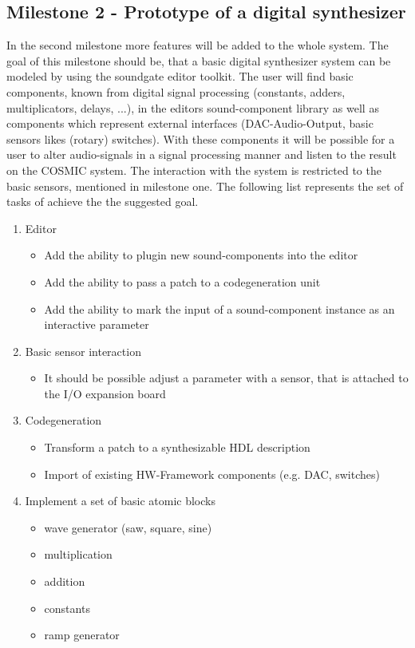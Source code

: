 \subsection{Milestone 2 - Prototype of a digital synthesizer}

In the second milestone more features will be added to the whole system. The goal of this milestone should be, that a basic digital synthesizer system can be modeled by using the soundgate editor toolkit. The user will find basic components, known from digital signal processing (constants, adders, multiplicators, delays, ...), in the editors sound-component library as well as components which represent external interfaces (DAC-Audio-Output, basic sensors likes (rotary) switches). With these components it will be possible for a user to alter audio-signals in a signal processing manner and listen to the result on the \ac{COSMIC} system. The interaction with the system is restricted to the basic sensors, mentioned in milestone one. The following list represents the set of tasks of achieve the the suggested goal.

	\begin{enumerate}
		\item Editor
			\begin{itemize}
				\item Add the ability to plugin new sound-components into the editor
				\item Add the ability to pass a patch to a codegeneration unit
				\item Add the ability to mark the input of a sound-component instance as an interactive parameter
			\end{itemize}
		\item Basic sensor interaction
			\begin{itemize}
				\item It should be possible adjust a parameter with a sensor, that is attached to the I/O expansion board
			\end{itemize}
		\item Codegeneration	
			\begin{itemize}
				\item Transform a patch to a synthesizable HDL description
				\item Import of existing HW-Framework components (e.g. DAC, switches)
			\end{itemize}
		\item Implement a set of basic atomic blocks
			\begin{itemize}
				\item wave generator (saw, square, sine)
				\item multiplication
				\item addition
				\item constants
				\item ramp generator
			\end{itemize}
	\end{enumerate}

